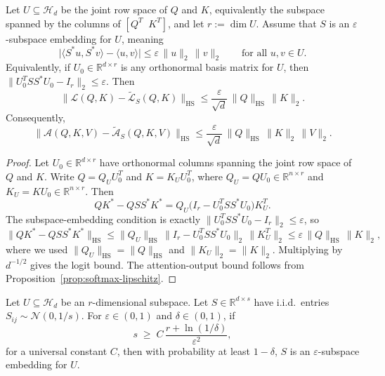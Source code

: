\begin{proposition}
    \label{prop:deterministic}
    Let $U \subseteq \mathcal{H}_d$ be the joint row space of $Q$ and $K$, equivalently the subspace spanned by the columns of $[Q^T \;\; K^T]$, and let $r := \dim U$. Assume that $S$ is an $\varepsilon$-subspace embedding for $U$, meaning
    \[
        \bigl|\langle S^*u, S^*v\rangle - \langle u, v\rangle\bigr| \leq \varepsilon\,\|u\|_2\,\|v\|_2
        \qquad
        \text{for all } u, v \in U.
    \]
    Equivalently, if $U_0 \in \mathbb{R}^{d \times r}$ is any orthonormal basis matrix for $U$, then $\|U_0^T SS^* U_0 - I_r\|_2 \leq \varepsilon$. Then
    \[
        \|\mathcal{L}(Q,K)-\widetilde{\mathcal{L}}_S(Q,K)\|_{\mathrm{HS}}
        \leq
        \frac{\varepsilon}{\sqrt d}\,\|Q\|_{\mathrm{HS}}\,\|K\|_2.
    \]
    Consequently,
    \[
        \|\mathcal{A}(Q,K,V)-\widetilde{\mathcal{A}}_S(Q,K,V)\|_{\mathrm{HS}}
        \leq
        \frac{\varepsilon}{\sqrt d}\,\|Q\|_{\mathrm{HS}}\,\|K\|_2\,\|V\|_2.
    \]
\end{proposition}

\begin{proof}
    Let $U_0 \in \mathbb{R}^{d \times r}$ have orthonormal columns spanning the joint row space of $Q$ and $K$. Write $Q = Q_U U_0^T$ and $K = K_U U_0^T$, where $Q_U = QU_0 \in \mathbb{R}^{n \times r}$ and $K_U = KU_0 \in \mathbb{R}^{n \times r}$. Then
    \[
        QK^* - QSS^*K^*
        = Q_U\bigl(I_r - U_0^T SS^* U_0\bigr)K_U^T.
    \]
    The subspace-embedding condition is exactly $\|U_0^T SS^* U_0 - I_r\|_2 \leq \varepsilon$, so
    \[
        \|QK^* - QSS^*K^*\|_{\mathrm{HS}}
        \leq \|Q_U\|_{\mathrm{HS}}\,\|I_r - U_0^T SS^* U_0\|_2\,\|K_U^T\|_2
        \leq \varepsilon\,\|Q\|_{\mathrm{HS}}\,\|K\|_2,
    \]
    where we used $\|Q_U\|_{\mathrm{HS}} = \|Q\|_{\mathrm{HS}}$ and $\|K_U\|_2 = \|K\|_2$. Multiplying by $d^{-1/2}$ gives the logit bound. The attention-output bound follows from Proposition~\ref{prop:softmax-lipschitz}.
\end{proof}

\begin{proposition}
    \label{prop:probabilistic}
    Let $U \subseteq \mathcal{H}_d$ be an $r$-dimensional subspace. Let $S \in \mathbb{R}^{d \times s}$ have i.i.d.\ entries $S_{ij} \sim \mathcal{N}(0, 1/s)$. For $\varepsilon \in (0, 1)$ and $\delta \in (0, 1)$, if
    \[
        s \;\geq\; C\,\frac{r + \ln(1/\delta)}{\varepsilon^2},
    \]
    for a universal constant $C$, then with probability at least $1 - \delta$, $S$ is an $\varepsilon$-subspace embedding for $U$.
\end{proposition}

